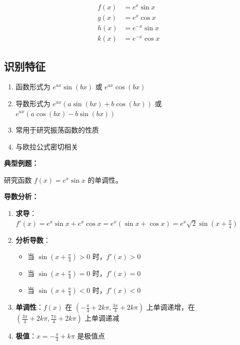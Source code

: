 \documentclass[a4paper,11pt]{ctexrep}
\newcommand{\exampleicon}{\ModeBadge[highlight]{例题}}
\newcommand{\analysisicon}{\ModeBadge[secondary]{分析}}
\theoremstyle{definition}
\begin{document}
\begin{definitionbox}[三角-指数复合型]
\begin{align}
f(x) &= e^x\sin x \\
g(x) &= e^x\cos x \\
h(x) &= e^{-x}\sin x \\
k(x) &= e^{-x}\cos x
\end{align}
\end{definitionbox}

\subsection{识别特征}

\begin{tipbox}[三角-指数复合型识别要点]
\begin{enumerate}
    \item 函数形式为 $e^{ax}\sin(bx)$ 或 $e^{ax}\cos(bx)$
    \item 导数形式为 $e^{ax}(a\sin(bx) + b\cos(bx))$ 或 $e^{ax}(a\cos(bx) - b\sin(bx))$
    \item 常用于研究振荡函数的性质
    \item 与欧拉公式密切相关
\end{enumerate}
\end{tipbox}

\exampleicon \textbf{典型例题：}

研究函数 $f(x) = e^x\sin x$ 的单调性。

\analysisicon \textbf{导数分析：}

\begin{enumerate}
    \item \textbf{求导}：$f'(x) = e^x\sin x + e^x\cos x = e^x(\sin x + \cos x) = e^x\sqrt{2}\sin(x + \frac{\pi}{4})$
    \item \textbf{分析导数}：
    \begin{itemize}
        \item 当 $\sin(x + \frac{\pi}{4}) > 0$ 时，$f'(x) > 0$
        \item 当 $\sin(x + \frac{\pi}{4}) = 0$ 时，$f'(x) = 0$
        \item 当 $\sin(x + \frac{\pi}{4}) < 0$ 时，$f'(x) < 0$
    \end{itemize}
    \item \textbf{单调性}：$f(x)$ 在 $(-\frac{\pi}{4} + 2k\pi, \frac{3\pi}{4} + 2k\pi)$ 上单调递增，在 $(\frac{3\pi}{4} + 2k\pi, \frac{7\pi}{4} + 2k\pi)$ 上单调递减
    \item \textbf{极值}：$x = -\frac{\pi}{4} + k\pi$ 是极值点
\end{enumerate}
\end{document}
